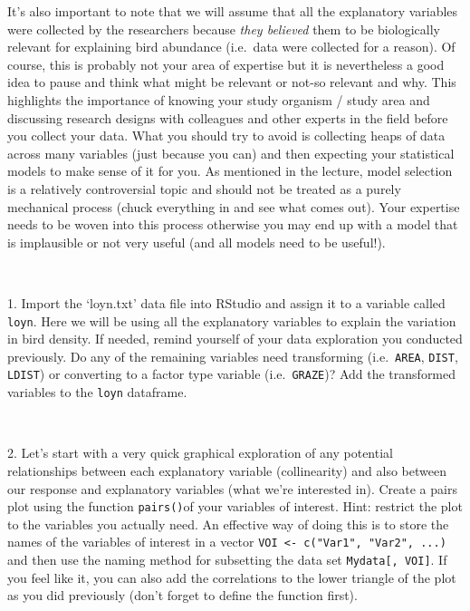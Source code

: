 \documentclass[
]{article}
\begin{document}
It's also important to note that we will assume that all the explanatory
variables were collected by the researchers because \emph{they believed}
them to be biologically relevant for explaining bird abundance
(i.e.~data were collected for a reason). Of course, this is probably not
your area of expertise but it is nevertheless a good idea to pause and
think what might be relevant or not-so relevant and why. This highlights
the importance of knowing your study organism / study area and
discussing research designs with colleagues and other experts in the
field before you collect your data. What you should try to avoid is
collecting heaps of data across many variables (just because you can)
and then expecting your statistical models to make sense of it for you.
As mentioned in the lecture, model selection is a relatively
controversial topic and should not be treated as a purely mechanical
process (chuck everything in and see what comes out). Your expertise
needs to be woven into this process otherwise you may end up with a
model that is implausible or not very useful (and all models need to be
useful!).

~

1. Import the `loyn.txt' data file into RStudio and assign it to a
variable called \texttt{loyn}. Here we will be using all the explanatory
variables to explain the variation in bird density. If needed, remind
yourself of your data exploration you conducted previously. Do any of
the remaining variables need transforming (i.e.~\texttt{AREA},
\texttt{DIST}, \texttt{LDIST}) or converting to a factor type variable
(i.e.~\texttt{GRAZE})? Add the transformed variables to the
\texttt{loyn} dataframe.

~

2. Let's start with a very quick graphical exploration of any potential
relationships between each explanatory variable (collinearity) and also
between our response and explanatory variables (what we're interested
in). Create a pairs plot using the function \texttt{pairs()}of your
variables of interest. Hint: restrict the plot to the variables you
actually need. An effective way of doing this is to store the names of
the variables of interest in a vector
\texttt{VOI\ \textless{}-\ c("Var1",\ "Var2",\ ...)} and then use the
naming method for subsetting the data set \texttt{Mydata{[},\ VOI{]}}.
If you feel like it, you can also add the correlations to the lower
triangle of the plot as you did previously (don't forget to define the
function first).

~
\end{document}
